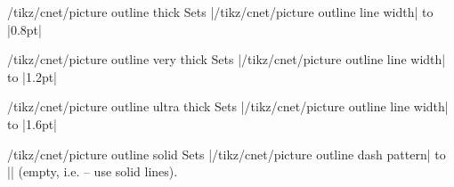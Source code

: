 \documentclass[a4paper]{ltxdoc}
\begin{document}
\begin{stylekey}{/tikz/cnet/picture outline thick}
  Sets |/tikz/cnet/picture outline line width| to |0.8pt|
\begin{codeexample}[]
\end{codeexample}
\end{stylekey}

\begin{stylekey}{/tikz/cnet/picture outline very thick}
 Sets |/tikz/cnet/picture outline line width| to |1.2pt|
\begin{codeexample}[]
\end{codeexample}
\end{stylekey}

\begin{stylekey}{/tikz/cnet/picture outline ultra thick}
  Sets |/tikz/cnet/picture outline line width| to |1.6pt|
\begin{codeexample}[]
\end{codeexample}
\end{stylekey}


\begin{stylekey}{/tikz/cnet/picture outline solid}
  Sets |/tikz/cnet/picture outline dash pattern| to |{}| (empty, i.e. -- use
  solid lines).
\begin{codeexample}[]
\end{codeexample}
\end{stylekey}
\end{document}
